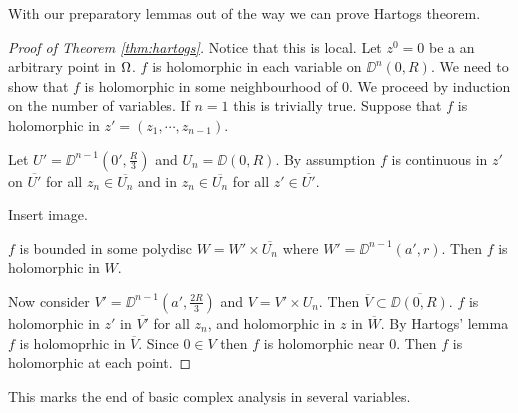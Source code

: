 With our preparatory lemmas out of the way we can prove Hartogs theorem.

\begin{proof}[Proof of Theorem \ref{thm:hartogs}]
    Notice that this is local. Let $z^0 = 0$ be a an arbitrary point in $\Omega$. $f $ is holomorphic in each variable on $\DD^n(0,R)$. We need to show that $f$ is holomorphic in some neighbourhood of $0$. We proceed by induction on the number of variables. If $n = 1$ this is trivially true. Suppose that $f$ is holomorphic in $z' = (z_1, \cdots, z_{n-1})$.

    Let $U' = \DD^{n-1} (0' , \frac{R}{3})$ and $U_n = \DD(0,R)$. By assumption $f$ is continuous in $z'$ on $\overline{U'}$ for all $z_n \in \overline{U_n}$ and in $z_n \in \overline{U_n}$ for all $z' \in \overline{U'}$.

    Insert image.

    $f$ is bounded in some polydisc $W = W' \times \overline{U_n}$ where $W' = \DD^{n-1}(a',r)$. Then $f$ is holomorphic in $W$. 
    
    Now consider $V' = \DD^{n-1}(a' , \frac{2R}{3})$ and $V = V' \times U_n$. Then $\overline{V} \subset \overline{\DD(0,R)}$. $f$ is holomorphic in $z'$ in $\overline{V'}$ for all $z_n$, and holomorphic in $z $ in $\overline{W}$. By Hartogs' lemma $f$ is holomoprhic in $\overline{V}$. Since $0 \in V$ then $f$ is holomorphic near $0$. Then $f$ is holomorphic at each point.
\end{proof}

This marks the end of basic complex analysis in several variables.
